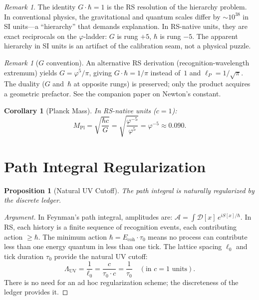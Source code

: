 \documentclass[12pt,a4paper]{article}
\newtheorem{corollary}[theorem]{Corollary}
\newtheorem{proposition}[theorem]{Proposition}
\theoremstyle{definition}
\theoremstyle{remark}
\newtheorem{remark}[theorem]{Remark}
\begin{document}
\begin{remark}
The identity $G \cdot \hbar = 1$ is the RS resolution of the
hierarchy problem.  In conventional physics, the gravitational
and quantum scales differ by $\sim 10^{38}$ in SI units---a
``hierarchy'' that demands explanation.  In RS-native units,
they are exact reciprocals on the $\varphi$-ladder: $G$ is
rung $+5$, $\hbar$ is rung $-5$.  The apparent hierarchy in
SI units is an artifact of the calibration seam, not a physical
puzzle.
\end{remark}

\begin{remark}[$G$ convention]
An alternative RS derivation (recognition-wavelength
extremum) yields $G = \varphi^5/\pi$, giving
$G \cdot \hbar = 1/\pi$ instead of~$1$ and
$\ell_P = 1/\sqrt{\pi}$.
The duality ($G$ and~$\hbar$ at opposite rungs) is
preserved; only the product acquires a geometric
prefactor.  See the companion paper on Newton's constant.
\end{remark}

\begin{corollary}[Planck Mass]
In RS-native units ($c = 1$):
\begin{equation}
  M_{\mathrm{Pl}} = \sqrt{\frac{\hbar c}{G}}
  = \sqrt{\frac{\varphi^{-5}}{\varphi^5}}
  = \varphi^{-5} \approx 0.090.
\end{equation}
\end{corollary}

\section{Path Integral Regularization}
\label{sec:path}

\begin{proposition}[Natural UV Cutoff]
\label{prop:uv}
The path integral is naturally regularized by the discrete
ledger.
\end{proposition}

\begin{proof}[Argument]
In Feynman's path integral, amplitudes are:
$\mathcal{A} = \int \mathcal{D}[x]\, e^{iS[x]/\hbar}$.
In RS, each history is a finite sequence of recognition events,
each contributing action $\geq \hbar$.  The minimum action
$\hbar = E_{\mathrm{coh}} \cdot \tau_0$ means no process can
contribute less than one energy quantum in less than one tick.
The lattice spacing $\ell_0$ and tick duration $\tau_0$ provide
the natural UV cutoff:
\begin{equation}
  \Lambda_{\mathrm{UV}} = \frac{1}{\ell_0}
  = \frac{c}{\tau_0 \cdot c} = \frac{1}{\tau_0}
  \quad (\text{in } c = 1 \text{ units}).
\end{equation}
There is no need for an ad hoc regularization scheme; the
discreteness of the ledger provides it.
\end{proof}
\end{document}

